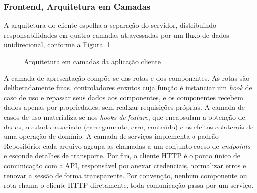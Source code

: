 \subsubsection{Frontend, Arquitetura em Camadas}

A arquitetura do cliente espelha a separação do servidor, distribuindo responsabilidades em quatro camadas atravessadas por um fluxo de dados unidirecional, conforme a Figura~\ref{fig:fe_arquitetura}.

\begin{figure}[H]
\centering
\caption{Arquitetura em camadas da aplicação cliente}
\label{fig:fe_arquitetura}
\setlength{\fboxsep}{8pt}
\end{figure}

A camada de apresentação compõe-se das rotas e dos componentes. As rotas são deliberadamente finas, controladores enxutos cuja função é instanciar um \textit{hook} de caso de uso e repassar seus dados aos componentes, e os componentes recebem dados apenas por propriedades, sem realizar requisições próprias. A camada de casos de uso materializa-se nos \textit{hooks de feature}, que encapsulam a obtenção de dados, o estado associado (carregamento, erro, conteúdo) e os efeitos colaterais de uma operação de domínio. A camada de serviços implementa o padrão Repositório: cada arquivo agrupa as chamadas a um conjunto coeso de \textit{endpoints} e esconde detalhes de transporte. Por fim, o cliente HTTP é o ponto único de comunicação com a API, responsável por anexar credenciais, normalizar erros e renovar a sessão de forma transparente. Por convenção, nenhum componente ou rota chama o cliente HTTP diretamente, toda comunicação passa por um serviço.


